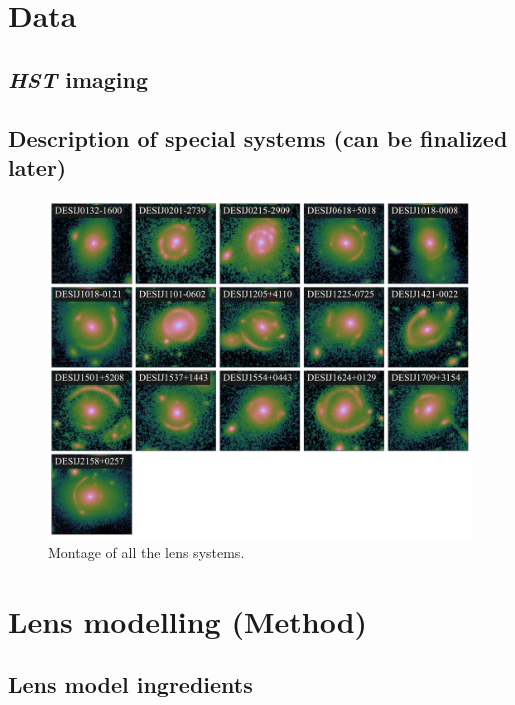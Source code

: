 \documentclass{aa}
\begin{document}
\section{Data} \label{sec:data}

\subsection{\textit{HST} imaging}


\subsection{Description of special systems (can be finalized later)}


\begin{figure}
	\includegraphics[width=\textwidth]{figures/lens_montage.pdf}
	\caption{\label{fig:montage}
	Montage of all the lens systems.
	}
\end{figure}

\section{Lens modelling (Method)} \label{sec:modeling_method}

\subsection{Lens model ingredients}
\end{document}

